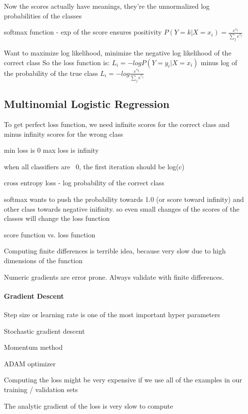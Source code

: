 Now the scores actually have meanings, they're the unnormalized log probabilities of the classes

softmax function - exp of the score ensures positivity
$ P(Y=k|X=x_i) = \frac{e^{s_k}}{\sum_j e^{s_j}} $

Want to maximize log likelihood, minimize the negative log likelihood of the correct class
So the loss function is:
$ L_i = - log P(Y=y_i|X=x_i) $
minus log of the probability of the true class
$ L_i = - log \frac{e^{s_{y_i}}}{\sum_j e^{s_j}} $

\subsection{Multinomial Logistic Regression}

To get perfect loss function, we need infinite scores for the correct class and minus infinity scores for the wrong class

min loss is 0 
max loss is infinity

when all classifiers are ~0, the first iteration should be log(c)

cross entropy loss
- log probability of the correct class

softmax wants to push the probability towards 1.0 (or score toward infinity) and other class towards negative inifinity. so even small changes of the scores of the classes will change the loss function

score function vs. loss function

Computing finite differences is terrible idea, because very slow due to high dimensions of the function

Numeric gradients are error prone.
Always validate with finite differences. 

\paragraph{Gradient Descent}

Step size or learning rate is one of the most important hyper parameters

Stochastic gradient descent

Momentum method

ADAM optimizer

Computing the loss might be very expensive if we use all of the examples in our training / validation sets

The analytic gradient of the loss is very slow to compute

